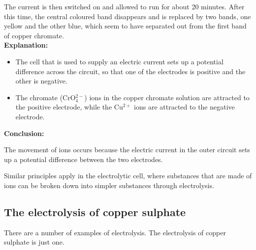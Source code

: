 {The current is then switched on and allowed to run for about 20 minutes. After this time, the central coloured band disappears and is replaced by two bands, one yellow and the other blue, which seem to have separated out from the first band of copper chromate. \\

\textbf{Explanation:} 

\begin{itemize}
\item{The cell that is used to supply an electric current sets up a potential difference across the circuit, so that one of the electrodes is positive and the other is negative.}
\item{The chromate (CrO$_{4}^{2-}$) ions in the copper chromate solution are attracted to the positive electrode, while the Cu$^{2+}$ ions are attracted to the negative electrode.}
\end{itemize}

\textbf{Conclusion:\\}

The movement of ions occurs because the electric current in the outer circuit sets up a potential difference between the two electrodes.
}

Similar principles apply in the electrolytic cell, where substances that are made of ions can be broken down into simpler substances through electrolysis.

\subsection{The electrolysis of copper sulphate}

There are a number of examples of electrolysis. The electrolysis of copper sulphate is just one.

